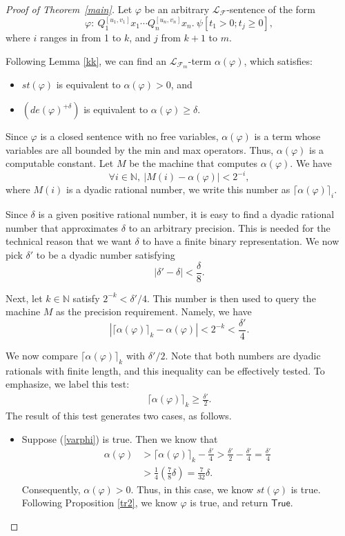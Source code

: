 \documentclass[prodmode]{acmsmall} %
\begin{document}
\begin{proof}[Proof of Theorem~\ref{main}] Let $\varphi$ be an arbitrary $\mathcal{L}_{\mathcal{F}}$-sentence of the form
$$\varphi:\ Q_1^{[u_1,v_1]}x_1\cdots Q_n^{[u_n,v_n]}x_n.\ \psi[t_1>0;t_j\geq 0],$$
where $i$ ranges in from 1 to  $k$, and $j$ from $k+1$ to $m$. 

Following Lemma \ref{kk}, we can find an $\mathcal{L}_{\mathcal{F}_m}$-term $\alpha(\varphi)$, which satisfies: 
\begin{itemize}
\item $\mathit{st}(\varphi)$ is equivalent to $\alpha(\varphi)>0$, and
\item $(de(\varphi)^{+\delta})$ is equivalent to $\alpha(\varphi)\geq \delta$. 
\end{itemize}
Since $\varphi$ is a closed sentence with no free variables, $\alpha(\varphi)$ is a term whose variables are all bounded by the min and max operators. Thus, $\alpha(\varphi)$ is a computable constant. Let $M$ be the machine that computes $\alpha(\varphi)$. We have
$$\forall i\in \mathbb{N},\ |M(i)-\alpha(\varphi)|<2^{-i},$$
where $M(i)$ is a dyadic rational number, we write this number as $\lceil \alpha(\varphi)\rceil_i$. 

Since $\delta$ is a given positive rational number, it is easy to find a dyadic rational number that approximates $\delta$ to an arbitrary precision. This is needed for the technical reason that we want $\delta$ to have a finite binary representation. We now pick $\delta'$ to be a dyadic number satisfying
$$|\delta'-\delta|<\frac{\delta}{8}.$$

Next, let $k\in \mathbb{N}$ satisfy $2^{-k}<\delta'/4$. This number is then used to query the machine $M$ as the precision requirement. Namely, we have
$$|\lceil \alpha(\varphi)\rceil_k - \alpha(\varphi)|<2^{-k}<\frac{\delta'}{4}.$$

We now compare $\lceil \alpha(\varphi)\rceil_k$ with $\delta'/2$. Note that both numbers are dyadic rationals with finite length, and this inequality can be effectively tested. To emphasize, we label this test:
\begin{eqnarray}\label{varphi}
\lceil \alpha(\varphi)\rceil_k \geq \frac{\delta'}{2}.
\end{eqnarray}
The result of this test generates two cases, as follows. 
\begin{itemize}
\item Suppose (\ref{varphi}) is true. Then we know that 
\begin{align*}
\alpha(\varphi)&>\lceil\alpha(\varphi)\rceil_k - \frac{\delta'}{4}  >\frac{\delta'}{2} -\frac{\delta'}{4} = \frac{\delta'}{4}\\
& >\frac{1}{4}(\frac{7}{8}\delta) = \frac{7}{32}\delta. 
\end{align*}
Consequently, $\alpha(\varphi)>0$. Thus, in this case, we know $st(\varphi)$ is true. Following Proposition \ref{tr2}, we know $\varphi$ is true, and return $\mathsf{True}$.


\end{itemize}
\end{proof}
\end{document}
